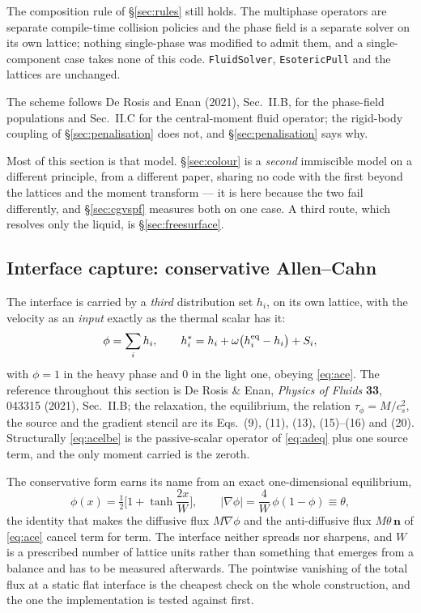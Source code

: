 \documentclass[11pt,a4paper]{article}
\newcommand{\code}[1]{\texttt{\small #1}}
\newcommand{\cs}{c_s}
\newcommand{\nn}{\bm{n}}
\begin{document}
The composition rule of \S\ref{sec:rules} still holds. The multiphase operators
are separate compile-time collision policies and the phase field is a separate
solver on its own lattice; nothing single-phase was modified to admit them, and
a single-component case takes none of this code. \code{FluidSolver},
\code{EsotericPull} and the lattices are unchanged.

The scheme follows De Rosis and Enan (2021), Sec.~II.B, for the phase-field
populations and Sec.~II.C for the central-moment fluid operator; the rigid-body
coupling of \S\ref{sec:penalisation} does not, and \S\ref{sec:penalisation}
says why.

Most of this section is that model. \S\ref{sec:colour} is a \emph{second}
immiscible model on a different principle, from a different paper, sharing no
code with the first beyond the lattices and the moment transform --- it is here
because the two fail differently, and \S\ref{sec:cgvspf} measures both on one
case. A third route, which resolves only the liquid, is \S\ref{sec:freesurface}.

\subsection{Interface capture: conservative Allen--Cahn}
\label{sec:ace}

The interface is carried by a \emph{third} distribution set $h_i$, on its own
lattice, with the velocity as an \emph{input} exactly as the thermal scalar has
it:
\begin{equation}
  \phi = \sum_i h_i, \qquad
  h_i^\ast = h_i + \omega\big(h_i^{\rm eq} - h_i\big) + S_i ,
  \label{eq:acelbe}
\end{equation}
with $\phi=1$ in the heavy phase and $0$ in the light one, obeying \eqref{eq:ace}.
The reference throughout this section is De Rosis \& Enan, \emph{Physics of
Fluids} \textbf{33}, 043315 (2021), Sec.~II.B; the relaxation, the equilibrium,
the relation $\tau_\phi = M/\cs^2$, the source and the gradient stencil are its
Eqs.~(9), (11), (13), (15)--(16) and (20). Structurally \eqref{eq:acelbe} is the
passive-scalar operator of \eqref{eq:adeq} plus one source term, and the only
moment carried is the zeroth.

The conservative form earns its name from an exact one-dimensional equilibrium,
\begin{equation}
  \phi(x) = \tfrac12\Big[1+\tanh\frac{2x}{W}\Big],
  \qquad
  |\nabla\phi| = \frac{4}{W}\,\phi(1-\phi) \equiv \theta ,
  \label{eq:tanh}
\end{equation}
the identity that makes the diffusive flux $M\nabla\phi$ and the anti-diffusive
flux $M\theta\,\nn$ of \eqref{eq:ace} cancel term for term. The interface neither
spreads nor sharpens, and $W$ is a prescribed number of lattice units rather
than something that emerges from a balance and has to be measured afterwards.
The pointwise vanishing of the total flux at a static flat interface is the
cheapest check on the whole construction, and the one the implementation is
tested against first.
\end{document}
